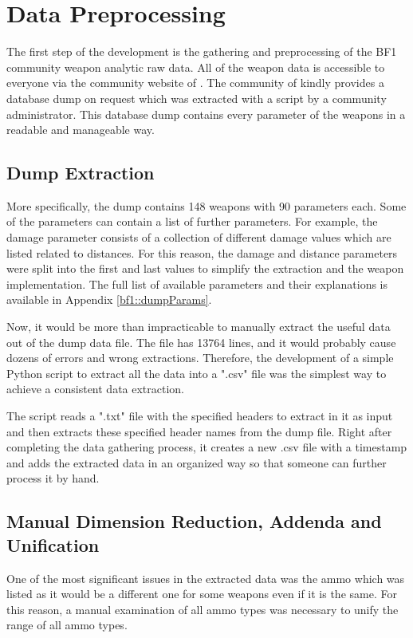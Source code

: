 \documentclass[MGS,Master,english]{twbook}%
\begin{document}
\section{Data Preprocessing} \label{dev::dataPreprocessing}
The first step of the development is the gathering and preprocessing of the \ac{BF1} community weapon analytic raw data. All of the weapon data is accessible to everyone via the community website of \citep{symthic::bf1stats}. The community of  kindly provides a database dump on request which was extracted with a script by a community administrator. This database dump contains every parameter of the weapons in a readable and manageable way.

\subsection{Dump Extraction} \label{chapter::dumpExtraction}
More specifically, the dump contains 148 weapons with 90 parameters each. Some of the parameters can contain a list of further parameters. For example, the damage parameter consists of a collection of different damage values which are listed related to distances. For this reason, the damage and distance parameters were split into the first and last values to simplify the extraction and the weapon implementation. The full list of available parameters and their explanations is available in Appendix \ref{bf1::dumpParams}.

Now, it would be more than impracticable to manually extract the useful data out of the dump data file. The file has 13764 lines, and it would probably cause dozens of errors and wrong extractions. Therefore, the development of a simple Python script to extract all the data into a ".csv" file was the simplest way to achieve a consistent data extraction. 

The script reads a ".txt" file with the specified headers to extract in it as input and then extracts these specified header names from the dump file. Right after completing the data gathering process, it creates a new .csv file with a timestamp and adds the extracted data in an organized way so that someone can further process it by hand.

\subsection{Manual Dimension Reduction, Addenda and Unification}
One of the most significant issues in the extracted data was the ammo which was listed as it would be a different one for some weapons even if it is the same. For this reason, a manual examination of all ammo types was necessary to unify the range of all ammo types. 
\end{document}
